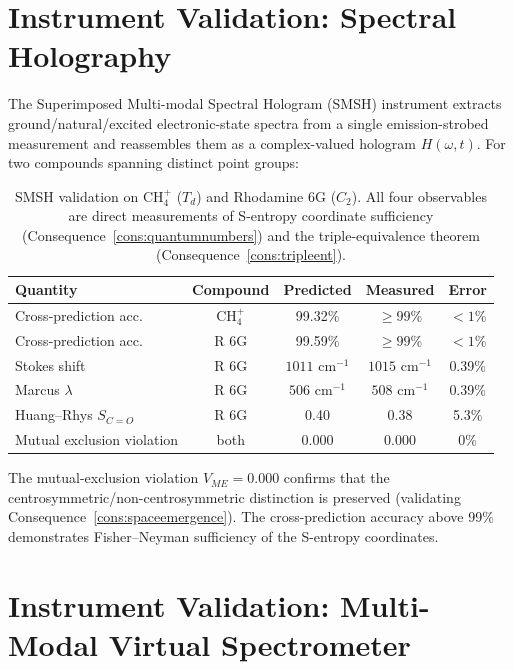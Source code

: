 \section{Instrument Validation: Spectral Holography}
\label{sec:smsh-ch25}

The Superimposed Multi-modal Spectral Hologram (SMSH) instrument extracts
ground/natural/excited electronic-state spectra from a single
emission-strobed measurement and reassembles them as a complex-valued
hologram $H(\omega,t)$.  For two compounds spanning distinct point groups:

\begin{table}[htbp]
\centering
\caption{SMSH validation on CH$_{4}^{+}$ ($T_{d}$) and Rhodamine 6G ($C_{2}$).
All four observables are direct measurements of S-entropy coordinate
sufficiency (Consequence~\ref{cons:quantumnumbers}) and the triple-equivalence
theorem (Consequence~\ref{cons:tripleent}).}
\label{tab:smsh}
\begin{tabular}{@{}lcccc@{}}
\toprule
Quantity & Compound & Predicted & Measured & Error \\
\midrule
Cross-prediction acc.     & CH$_{4}^{+}$ & 99.32\% & $\geq 99$\% & $<1$\% \\
Cross-prediction acc.     & R 6G         & 99.59\% & $\geq 99$\% & $<1$\% \\
Stokes shift              & R 6G         & $1011$ cm$^{-1}$ & $1015$ cm$^{-1}$ & 0.39\% \\
Marcus $\lambda$          & R 6G         & $506$ cm$^{-1}$  & $508$ cm$^{-1}$  & 0.39\% \\
Huang--Rhys $S_{C=O}$     & R 6G         & 0.40 & 0.38 & 5.3\% \\
Mutual exclusion violation & both        & 0.000 & 0.000 & 0\% \\
\bottomrule
\end{tabular}
\end{table}

The mutual-exclusion violation $V_{ME}=0.000$ confirms that the
centrosymmetric/non-centrosymmetric distinction is preserved
(validating Consequence~\ref{cons:spaceemergence}).
The cross-prediction accuracy above 99\% demonstrates Fisher--Neyman
sufficiency of the S-entropy coordinates.

\section{Instrument Validation: Multi-Modal Virtual Spectrometer}
\label{sec:mmvs-ch25}

